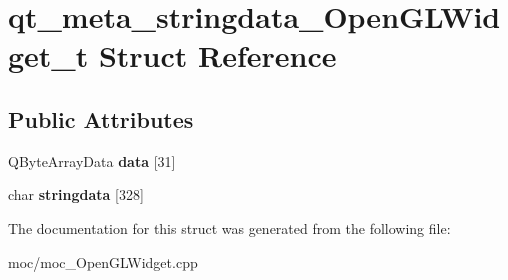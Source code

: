\hypertarget{structqt__meta__stringdata___open_g_l_widget__t}{\section{qt\-\_\-meta\-\_\-stringdata\-\_\-\-Open\-G\-L\-Widget\-\_\-t Struct Reference}
\label{structqt__meta__stringdata___open_g_l_widget__t}
}
\subsection*{Public Attributes}
\begin{DoxyCompactItemize}
\item 
\hypertarget{structqt__meta__stringdata___open_g_l_widget__t_ab88e1d7794315f418f4845a213d5c369}{Q\-Byte\-Array\-Data {\bfseries data} \mbox{[}31\mbox{]}}\label{structqt__meta__stringdata___open_g_l_widget__t_ab88e1d7794315f418f4845a213d5c369}

\item 
\hypertarget{structqt__meta__stringdata___open_g_l_widget__t_a27e9c54bfda21ab94c4e960402570573}{char {\bfseries stringdata} \mbox{[}328\mbox{]}}\label{structqt__meta__stringdata___open_g_l_widget__t_a27e9c54bfda21ab94c4e960402570573}

\end{DoxyCompactItemize}


The documentation for this struct was generated from the following file\-:\begin{DoxyCompactItemize}
\item 
moc/moc\-\_\-\-Open\-G\-L\-Widget.\-cpp\end{DoxyCompactItemize}
